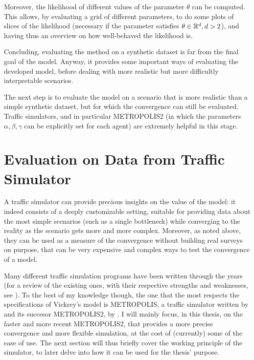 Moreover, the likelihood of different values of the parameter \(\theta\) can be computed.
This allows, by evaluating a grid of different parameters,
to do some plots of slices of the likelihood (necessary if the parameter satisfies \(\theta \in \mathbb{R}^d, d > 2\)),
and having thus an overview on how well-behaved the likelihood is.

Concluding, evaluating the method on a synthetic dataset is far from the final goal of the model.
Anyway, it provides some important ways of evaluating the developed model,
before dealing with more realistic but more difficultly interpretable scenarios.

The next step is to evaluate the model on a scenario that is more realistic than a simple synthetic dataset,
but for which the convergence can still be evaluated.
Traffic simulators, and in particular METROPOLIS2 (in which the parameters \(\alpha, \beta, \gamma\) can be explicitly set for each agent)
are extremely helpful in this stage.

\section{Evaluation on Data from Traffic Simulator}
\label{sec:eval_metr}

A traffic simulator can provide precious insights on the value of the model:
it indeed consists of a deeply customizable setting,
suitable for providing data about the most simple scenarios (such as a single bottleneck)
while converging to the reality as the scenario gets more and more complex.
Moreover, as noted above,
they can be used as a measure of the convergence without building real surveys on purpose,
that can be very expensive and complex ways to test the convergence of a model.

Many different traffic simulation programs have been written through the years
(for a review of the existing ones, with their respective strengths and weaknesses, see \cite{NGUYEN2021100486}).
To the best of my knowledge though,
the one that the most respects the specifications of Vickrey's model \parencite{LI2020311} is METROPOLIS,
a traffic simulator written by \textcite{de1997metropolis} and its succesor METROPOLIS2, by \textcite{RePEc:ema:worpap:2024-03}.
I will mainly focus, in this thesis,
on the faster and more recent METROPOLIS2,
that provides a more precise convergence and more flexible simulation,
at the cost of (currently) some of the ease of use.
The next section will thus briefly cover the working principle of the simulator,
to later delve into how it can be used for the thesis' purpose.

